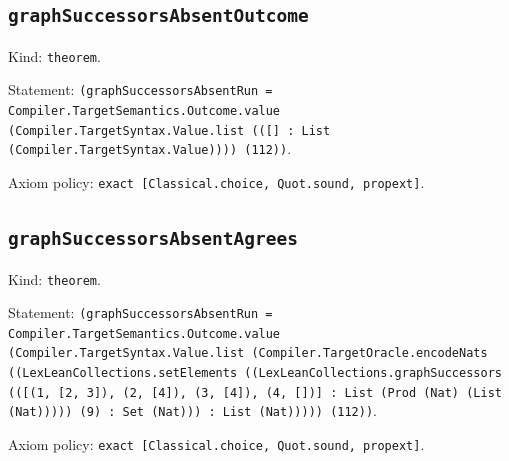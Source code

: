 \documentclass[11pt]{article}
\begin{document}
\subsection*{\texttt{graphSuccessorsAbsentOutcome}}
\noindent Kind: \texttt{theorem}.\par
\noindent Statement: \texttt{(graphSuccessorsAbsentRun = Compiler.TargetSemantics.Outcome.value (Compiler.TargetSyntax.Value.list (([] : List (Compiler.TargetSyntax.Value)))) (112))}.\par
\noindent Axiom policy: \texttt{exact [Classical.choice, Quot.sound, propext]}.\par
\subsection*{\texttt{graphSuccessorsAbsentAgrees}}
\noindent Kind: \texttt{theorem}.\par
\noindent Statement: \texttt{(graphSuccessorsAbsentRun = Compiler.TargetSemantics.Outcome.value (Compiler.TargetSyntax.Value.list (Compiler.TargetOracle.encodeNats ((LexLeanCollections.setElements ((LexLeanCollections.graphSuccessors (([(1, [2, 3]), (2, [4]), (3, [4]), (4, [])] : List (Prod (Nat) (List (Nat))))) (9) : Set (Nat))) : List (Nat))))) (112))}.\par
\noindent Axiom policy: \texttt{exact [Classical.choice, Quot.sound, propext]}.\par
\end{document}
